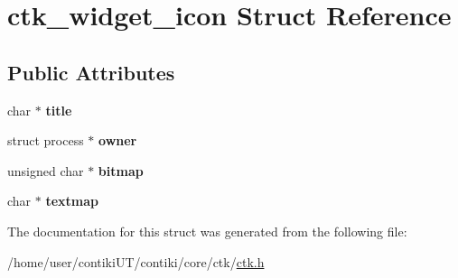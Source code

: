 \hypertarget{structctk__widget__icon}{}\section{ctk\+\_\+widget\+\_\+icon Struct Reference}
\label{structctk__widget__icon}
\subsection*{Public Attributes}
\begin{DoxyCompactItemize}
\item 
\hypertarget{structctk__widget__icon_a7aa409213263823baa339f100026ce3c}{}char $\ast$ {\bfseries title}\label{structctk__widget__icon_a7aa409213263823baa339f100026ce3c}

\item 
\hypertarget{structctk__widget__icon_a1eede971b3aa19f59fdf65f085cc5888}{}struct process $\ast$ {\bfseries owner}\label{structctk__widget__icon_a1eede971b3aa19f59fdf65f085cc5888}

\item 
\hypertarget{structctk__widget__icon_ae6eb6de6720ad67c3ad8a07cf3043cfe}{}unsigned char $\ast$ {\bfseries bitmap}\label{structctk__widget__icon_ae6eb6de6720ad67c3ad8a07cf3043cfe}

\item 
\hypertarget{structctk__widget__icon_ae926bb8e20cda0eba9f1868435d7a2a3}{}char $\ast$ {\bfseries textmap}\label{structctk__widget__icon_ae926bb8e20cda0eba9f1868435d7a2a3}

\end{DoxyCompactItemize}


The documentation for this struct was generated from the following file\+:\begin{DoxyCompactItemize}
\item 
/home/user/contiki\+U\+T/contiki/core/ctk/\hyperlink{ctk_8h}{ctk.\+h}\end{DoxyCompactItemize}
